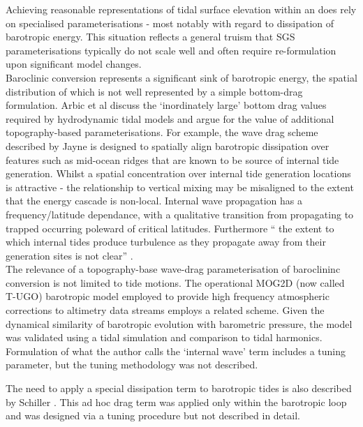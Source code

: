 Achieving reasonable representations of tidal surface elevation within an \OGCM{} does rely on specialised parameterisations - most notably with regard to dissipation of barotropic energy.   This situation reflects a general truism that SGS parameterisations typically do not scale well and often require re-formulation upon significant model changes.\\
Baroclinic conversion represents a significant sink of barotropic energy, the spatial distribution of which is not well represented by a simple bottom-drag formulation.  
Arbic et al \cite{Arbic:2004wz} discuss the `inordinately large' bottom drag values required by hydrodynamic tidal models and argue for the value of additional topography-based parameterisations.   
For example, the wave drag scheme described by Jayne \cite{Jayne:2001tr} is designed to spatially align barotropic dissipation over features such as mid-ocean ridges that are known to be source of internal tide generation.  Whilst a spatial concentration over internal tide generation locations is attractive - the relationship to vertical mixing may be misaligned to the extent that the energy cascade is non-local.  Internal wave propagation has a frequency/latitude dependance, with a qualitative transition from propagating to trapped occurring poleward of critical latitudes.  Furthermore `` the extent to which internal tides produce turbulence as they propagate away from their generation sites is not clear'' \citep[pp812]{Jayne:2001tr}.\\




The relevance of a topography-base wave-drag parameterisation of baroclininc conversion is not limited to tide motions.  The operational MOG2D (now called T-UGO) barotropic model \citep{Carrere:2003cj} employed to provide high frequency atmospheric corrections to altimetry data streams employs a related scheme.   Given the dynamical similarity of barotropic evolution with barometric pressure, the model was validated using a tidal simulation and comparison to tidal harmonics.   Formulation of what the author calls the `internal wave' term includes a tuning parameter, but the tuning methodology was not described.



The need to apply a special dissipation term to barotropic tides is also described by Schiller \citep[Eq 6]{Schiller:2007gk}.   This ad hoc drag term was applied only within the barotropic loop and was designed via a tuning procedure but not described in detail.




